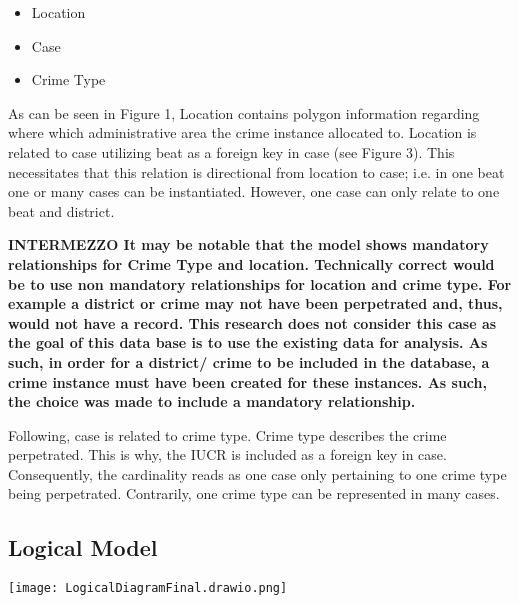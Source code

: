 \documentclass[a4paper]{article}
\begin{document}
\begin{itemize}
  \item Location
  \item Case
  \item Crime Type
\end{itemize}

\indent As can be seen in Figure 1, Location contains polygon information regarding where which administrative area the crime instance allocated to. Location is related to case utilizing beat as a foreign key in case (see Figure 3). This necessitates that this relation is directional from location to case; i.e. in one beat one or many cases can be instantiated. However, one case can only relate to one beat and district.

\textbf{INTERMEZZO It may be notable that the model shows mandatory relationships for Crime Type and location. Technically correct would be to use non mandatory relationships for location and crime type. For example a district or crime may not have been perpetrated and, thus, would not have a record. This research does not consider this case as the goal of this data base is to use the existing data for analysis. As such, in order for a district/ crime to be included in the database, a crime instance must have been created for these instances. As such, the choice was made to include a mandatory relationship.}

Following, case is related to crime type. Crime type describes the crime perpetrated. This is why, the IUCR is included as a foreign key in case. Consequently, the cardinality reads as one case only pertaining to one crime type being perpetrated. Contrarily, one crime type can be represented in many cases.

\subsection{Logical Model}
\texttt{[image: LogicalDiagramFinal.drawio.png]}
\end{document}
